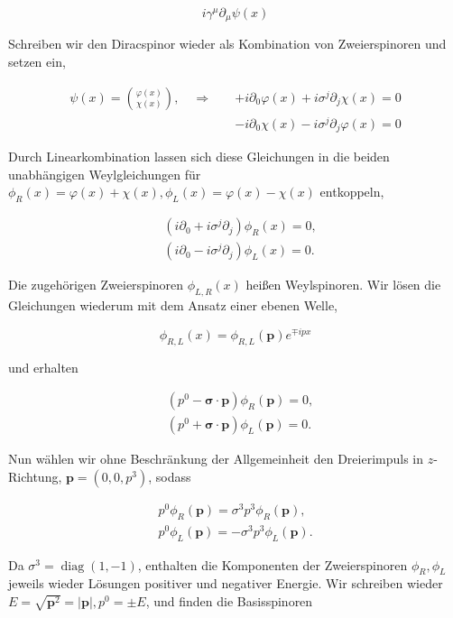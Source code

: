 \documentclass[10pt, letterpaper]{article}
\begin{document}
$$
i \gamma^{\mu} \partial_{\mu} \psi(x)
$$

Schreiben wir den Diracspinor wieder als Kombination von Zweierspinoren und setzen ein,

$$
\begin{aligned}
\psi(x)=\binom{\varphi(x)}{\chi(x)}, \quad \Rightarrow \quad & +i \partial_{0} \varphi(x)+i \sigma^{j} \partial_{j} \chi(x)=0 \\
& -i \partial_{0} \chi(x)-i \sigma^{j} \partial_{j} \varphi(x)=0
\end{aligned}
$$

Durch Linearkombination lassen sich diese Gleichungen in die beiden unabhängigen Weylgleichungen für $\phi_{R}(x)=\varphi(x)+\chi(x), \phi_{L}(x)=\varphi(x)-\chi(x)$ entkoppeln,

$$
\begin{aligned}
& \left(i \partial_{0}+i \sigma^{j} \partial_{j}\right) \phi_{R}(x)=0, \\
& \left(i \partial_{0}-i \sigma^{j} \partial_{j}\right) \phi_{L}(x)=0 .
\end{aligned}
$$

Die zugehörigen Zweierspinoren $\phi_{L, R}(x)$ heißen Weylspinoren. Wir lösen die Gleichungen wiederum mit dem Ansatz einer ebenen Welle,

$$
\phi_{R, L}(x)=\phi_{R, L}(\mathbf{p}) e^{\mp i p x}
$$

und erhalten

$$
\begin{aligned}
& \left(p^{0}-\boldsymbol{\sigma} \cdot \mathbf{p}\right) \phi_{R}(\mathbf{p})=0, \\
& \left(p^{0}+\boldsymbol{\sigma} \cdot \mathbf{p}\right) \phi_{L}(\mathbf{p})=0 .
\end{aligned}
$$

Nun wählen wir ohne Beschränkung der Allgemeinheit den Dreierimpuls in $z$-Richtung, $\mathbf{p}=\left(0,0, p^{3}\right)$, sodass

$$
\begin{gathered}
p^{0} \phi_{R}(\mathbf{p})=\sigma^{3} p^{3} \phi_{R}(\mathbf{p}), \\
p^{0} \phi_{L}(\mathbf{p})=-\sigma^{3} p^{3} \phi_{L}(\mathbf{p}) .
\end{gathered}
$$

Da $\sigma^{3}=\operatorname{diag}(1,-1)$, enthalten die Komponenten der Zweierspinoren $\phi_{R}, \phi_{L}$ jeweils wieder Lösungen positiver und negativer Energie. Wir schreiben wieder $E=\sqrt{\mathbf{p}^{2}}= |\mathbf{p}|, p^{0}= \pm E$, und finden die Basisspinoren
\end{document}
